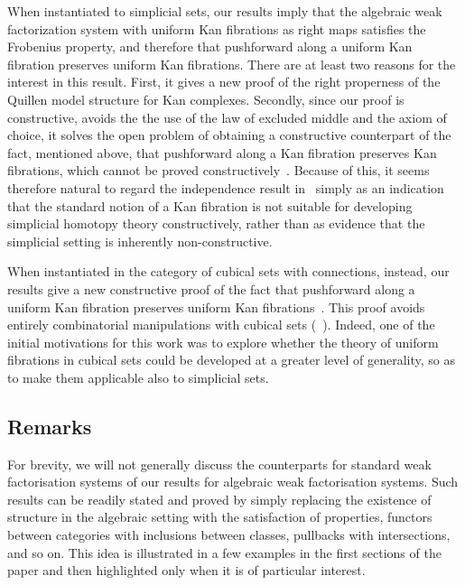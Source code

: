 \documentclass[reqno,10pt,a4paper,oneside,draft]{amsart}
\begin{document}
When instantiated to simplicial sets, our results imply that 
the algebraic weak factorization system 
with uniform Kan fibrations as right maps satisfies the 
Frobenius property, and therefore that pushforward along a uniform Kan fibration preserves uniform Kan fibrations. There are at least two reasons for the interest in this result. 
First, it gives a new proof of the right properness of the Quillen model structure for Kan complexes. Secondly, since our proof is constructive, \ie avoids the the use of the law of excluded middle and the axiom of choice, it
solves the open problem of obtaining a constructive counterpart of the fact, mentioned above, that pushforward along a  Kan fibration preserves  Kan fibrations, which cannot be proved constructively~\cite{coquand-non-constructivity-kan}. Because of this, it seems therefore natural to regard the independence result in~\cite{coquand-non-constructivity-kan} simply as an indication that the standard notion of a Kan fibration is not suitable for developing simplicial homotopy theory constructively, rather than as evidence that the simplicial setting is inherently non-constructive.

When instantiated in the category of cubical sets with connections, instead,
our results give  a new constructive 
proof of the fact that pushforward along a uniform Kan fibration preserves uniform Kan fibrations~\cite{cohen-et-al:cubicaltt}. This proof avoids entirely combinatorial manipulations with cubical sets (\cf~\cite{huber-thesis}). Indeed, one of the initial motivations for this work was to explore whether the theory of uniform fibrations
in cubical sets could be developed at a greater level of generality, so as to make them applicable also to simplicial sets. 


\subsection*{Remarks} For brevity, we will not generally discuss the counterparts 
 for standard weak factorisation systems of our results for algebraic
weak factorisation systems.
Such results can be readily stated and proved by simply replacing 
the existence of structure in the algebraic setting with the satisfaction of properties,
functors between categories with inclusions between
classes, pullbacks with intersections, and so on. This idea is illustrated in 
a few examples in the first sections of the paper and then highlighted only 
when it is of particular interest.
\end{document}
